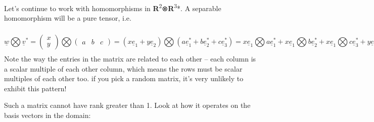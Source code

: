 \documentclass[oneside,english]{amsbook}
\numberwithin{section}{chapter}
\theoremstyle{plain}
\theoremstyle{definition}
\begin{document}
Let's continue to work with homomorphisms in
\textbf{R}\textsuperscript{2}⊗\textbf{R}\textsuperscript{3}*. A
separable homomorphism will be a pure tensor, i.e.

\[{\underline{w}\bigotimes{\underline{v}}^{*} = \begin{pmatrix}
		x \\
		y
	\end{pmatrix}\bigotimes\begin{pmatrix}
		a & b & c
	\end{pmatrix}
}{= \left( x{\underline{e}}_{1} + y{\underline{e}}_{2} \right)\bigotimes\left( a{\underline{e}}_{1}^{*} + b{\underline{e}}_{2}^{*} + c{\underline{e}}_{3}^{*} \right)
}{= x{\underline{e}}_{1}\bigotimes a{\underline{e}}_{1}^{*} + x{\underline{e}}_{1}\bigotimes b{\underline{e}}_{2}^{*} + x{\underline{e}}_{1}\bigotimes c{\underline{e}}_{3}^{*} + y{\underline{e}}_{2}\bigotimes a{\underline{e}}_{1}^{*} + y{\underline{e}}_{2}\bigotimes b{\underline{e}}_{2}^{*} + y{\underline{e}}_{2}\bigotimes c{\underline{e}}_{3}^{*}
}{= ax{\underline{e}}_{1}\bigotimes{\underline{e}}_{1}^{*} + bx{\underline{e}}_{1}\bigotimes{\underline{e}}_{2}^{*} + cx{\underline{e}}_{1}\bigotimes{\underline{e}}_{3}^{*} + ay{\underline{e}}_{2}\bigotimes{\underline{e}}_{1}^{*} + by{\underline{e}}_{2}\bigotimes{\underline{e}}_{2}^{*} + cy{\underline{e}}_{2}\bigotimes{\underline{e}}_{3}^{*}
}{= \begin{pmatrix}
		ax & \begin{matrix}
			bx & cx
		\end{matrix} \\
		ay & \begin{matrix}
			by & cy
		\end{matrix}
	\end{pmatrix}
}\]Note the way the entries in the matrix are related to each other --
each column is a scalar multiple of each other column, which means the
rows must be scalar multiples of each other too. if you pick a random
matrix, it's very unlikely to exhibit this pattern!

Such a matrix cannot have rank greater than 1. Look at how it operates
on the basis vectors in the domain:
\end{document}

